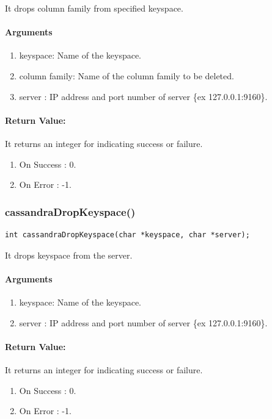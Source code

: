  It drops  column family from specified keyspace.

  \paragraph{Arguments}
  \begin{enumerate}
   \item keyspace: Name of the keyspace.
   \item column family: Name of the column family to be deleted.
   \item server : IP address and port number of server \{ex 127.0.0.1:9160\}.
  \end{enumerate}

 \paragraph{Return Value:}
 It returns an integer  for indicating success or failure.
\begin{enumerate}
 \item On Success : 0.
 \item On Error   : -1.
\end{enumerate}

\subsubsection{cassandraDropKeyspace()}
\begin{verbatim}
int cassandraDropKeyspace(char *keyspace, char *server);
\end{verbatim}

  It drops  keyspace from the server.

  \paragraph{Arguments}
  \begin{enumerate}
   \item keyspace: Name of the keyspace.
   \item server : IP address and port number of server \{ex 127.0.0.1:9160\}.
  \end{enumerate}

 \paragraph{Return Value:}
 It returns an integer  for indicating success or failure.
\begin{enumerate}
 \item On Success : 0.
 \item On Error   : -1.
\end{enumerate}

